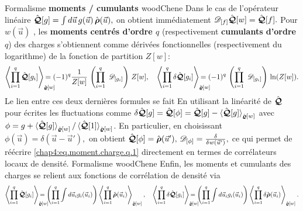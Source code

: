 \EncadreDeux
{Formalisme}{{\bf \textsf{{ moments /
                        cumulants}} \textsf{}}}{woodChene}{
    Dans le cas de l’opérateur linéaire \( \hat{\boldsymbol{\mathcal Q}}[g] = \int d\vec{u}\, g(\vec{u})\,
    \hat{\boldsymbol{\rho}}(\vec{u}), \) on obtient immédiatement \(
    \mathscr{D}_{[f]}\hat{\boldsymbol{\mathcal Q}}[w] = \hat{\boldsymbol{\mathcal Q}}[f]. \) Pour
    $w(\vec{u})$ , les {\bf moments centrés d'ordre $q$} (respectivement {\bf
            cumulants d’ordre $q$}) des charges s’obtiennent comme dérivées fonctionnelles
    (respectivement du logarithme) de la fonction de partition $Z[w]$:
    \begin{eqnarray}\label{chap4:eq.moment.charge.q.1}
        \left \langle \prod_{i = 1}^q\operator{\mathcal{Q}}[g_i] \right \rangle_{\operator{\varrho}[w]} \mkern-30mu =  (-1)^q \frac{1}{Z[w]} \,  \left ( \prod_{i = 1}^q\ \dfonc{g_i} \right ) \,  Z[w], \quad
        \left \langle \prod_{i = 1}^q \delta\operator{\mathcal{Q}}[g_i]  \right \rangle_{\operator{\varrho}[w]} \mkern-30mu  =  (-1)^q \, \left ( \prod_{i = 1}^q\ \dfonc{g_i} \right ) \,  \ln(Z[w]).
    \end{eqnarray}
    Le lien entre ces deux dernières formules se fait En utilisant la linéarité de $\hat{\boldsymbol{\mathcal{Q}}}$ pour écrites les fluctuations comme $\delta\hat{\boldsymbol{\mathcal{Q}}}[g] = \hat{\boldsymbol{\mathcal{Q}}}[\phi] = \hat{\boldsymbol{\mathcal{Q}}}[g] - \braket{\hat{\boldsymbol{\mathcal{Q}}}[g]}_{\hat{\boldsymbol{\varrho}}[w]}$ avec $\phi = g + \braket{\hat{\boldsymbol{\mathcal{Q}}}[g]}_{\hat{\boldsymbol{\varrho}}[w]}/\braket{\hat{\boldsymbol{\mathcal{Q}}}[1]}_{\hat{\boldsymbol{\varrho}}[w]}$.
    En particulier, en choisissant \( \phi(\vec{u}) = \delta(\vec{u}-\vec{u}'), \)
    on obtient \( \hat{\boldsymbol{\mathcal Q}}[\phi] =
    \hat{\boldsymbol{\rho}}(\vec{u}'), \, \mathscr{D}_{[\phi]} = \frac{\delta}{\delta
        w(\vec{u}')}, \) ce qui permet de réécrire \eqref{chap4:eq.moment.charge.q.1}
    directement en termes de corrélateurs locaux de densité.
}
\EncadreDeux
{Formalisme}{{\bf \textsf{} \textsf{}}}{woodChene}{
    Enfin, les moments et cumulants des charges se relient aux fonctions de
    corrélation de densité via
    \begin{eqnarray}
        \left \langle \prod_{i = 1}^q\operator{\mathcal{Q}}[g_i] \right \rangle_{\operator{\varrho}[w]}  \mkern-30mu =  \left ( \prod_{i = 1}^q  \int d\vec{u}_i g_i(\vec{u}_i) \right )   \left \langle \prod_{i = 1}^q \operator{\rho}(\vec{u}_i) \right \rangle_{\operator{\varrho}[w]}, \quad
        \left \langle \prod_{i = 1}^q \delta \operator{\mathcal{Q}}[g_i] \right \rangle_{\operator{\varrho}[w]}   \mkern-30mu = \left ( \prod_{i = 1}^q  \int d\vec{u}_i g_i(\vec{u}_i) \right )   \left \langle \prod_{i = 1}^q \delta \operator{\rho}(\vec{u}_i) \right \rangle_{\operator{\varrho}[w]}.
    \end{eqnarray}
}
